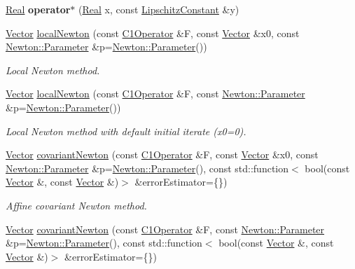 \begin{DoxyCompactItemize}
\item 
\hypertarget{namespaceSpacy_af2f966e1b7480cdbd9ac1d9efc5b32f3}{\hyperlink{classSpacy_1_1Real}{\-Real} {\bfseries operator$\ast$} (\hyperlink{classSpacy_1_1Real}{\-Real} x, const \hyperlink{classSpacy_1_1LipschitzConstant}{\-Lipschitz\-Constant} \&y)}\label{namespaceSpacy_af2f966e1b7480cdbd9ac1d9efc5b32f3}

\item 
\hyperlink{classSpacy_1_1Vector}{\-Vector} \hyperlink{group__NewtonGroup_ga448b8e78b2e84ed78e70c42114ea7599}{local\-Newton} (const \hyperlink{classSpacy_1_1C1Operator}{\-C1\-Operator} \&\-F, const \hyperlink{classSpacy_1_1Vector}{\-Vector} \&x0, const \hyperlink{structSpacy_1_1Newton_1_1Parameter}{\-Newton\-::\-Parameter} \&p=\hyperlink{structSpacy_1_1Newton_1_1Parameter}{\-Newton\-::\-Parameter}())
\begin{DoxyCompactList}\small\item\em \-Local \-Newton method. \end{DoxyCompactList}\item 
\hyperlink{classSpacy_1_1Vector}{\-Vector} \hyperlink{group__NewtonGroup_gafbe5e25f46f7b0d237f5e9971cef998a}{local\-Newton} (const \hyperlink{classSpacy_1_1C1Operator}{\-C1\-Operator} \&\-F, const \hyperlink{structSpacy_1_1Newton_1_1Parameter}{\-Newton\-::\-Parameter} \&p=\hyperlink{structSpacy_1_1Newton_1_1Parameter}{\-Newton\-::\-Parameter}())
\begin{DoxyCompactList}\small\item\em \-Local \-Newton method with default initial iterate (x0=0). \end{DoxyCompactList}\item 
\hyperlink{classSpacy_1_1Vector}{\-Vector} \hyperlink{group__NewtonGroup_ga6c18ad252cb530e4f6734eb4e4fda481}{covariant\-Newton} (const \hyperlink{classSpacy_1_1C1Operator}{\-C1\-Operator} \&\-F, const \hyperlink{classSpacy_1_1Vector}{\-Vector} \&x0, const \hyperlink{structSpacy_1_1Newton_1_1Parameter}{\-Newton\-::\-Parameter} \&p=\hyperlink{structSpacy_1_1Newton_1_1Parameter}{\-Newton\-::\-Parameter}(), const std\-::function$<$ bool(const \hyperlink{classSpacy_1_1Vector}{\-Vector} \&, const \hyperlink{classSpacy_1_1Vector}{\-Vector} \&)$>$ \&error\-Estimator=\{\})
\begin{DoxyCompactList}\small\item\em \-Affine covariant \-Newton method. \end{DoxyCompactList}\item 
\hyperlink{classSpacy_1_1Vector}{\-Vector} \hyperlink{group__NewtonGroup_ga2d469322482680319bf81d865ed57068}{covariant\-Newton} (const \hyperlink{classSpacy_1_1C1Operator}{\-C1\-Operator} \&\-F, const \hyperlink{structSpacy_1_1Newton_1_1Parameter}{\-Newton\-::\-Parameter} \&p=\hyperlink{structSpacy_1_1Newton_1_1Parameter}{\-Newton\-::\-Parameter}(), const std\-::function$<$ bool(const \hyperlink{classSpacy_1_1Vector}{\-Vector} \&, const \hyperlink{classSpacy_1_1Vector}{\-Vector} \&)$>$ \&error\-Estimator=\{\})

\end{DoxyCompactItemize}
